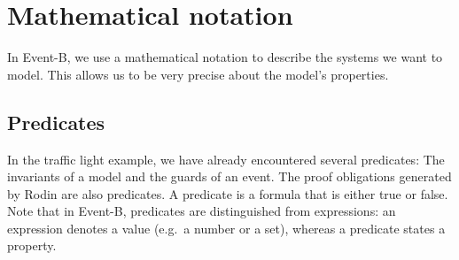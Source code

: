 \newcommand{\dascii}[1]{\textrm{ASCII: } \texttt{#1}}
\newcommand{\lascii}[1]{\qquad\quad \textrm{ASCII: } \texttt{#1}}
\newcommand{\inascii}[1]{(ASCII: \texttt{#1})}

\section{Mathematical notation}
\label{tut_mathematical_notation}
In Event-B, we use a mathematical notation to describe the systems we want to model.
This allows us to be very precise about the model's properties.

\subsection{Predicates}
\label{tut_predicates}
In the traffic light example, we have already encountered several predicates: The invariants of a model and the guards of an event. The proof obligations generated by Rodin are also predicates.  A predicate is a formula that is either true or false. Note that in Event-B, predicates are distinguished from expressions: an expression denotes a value (e.g.\ a number or a set), whereas a predicate states a property.

